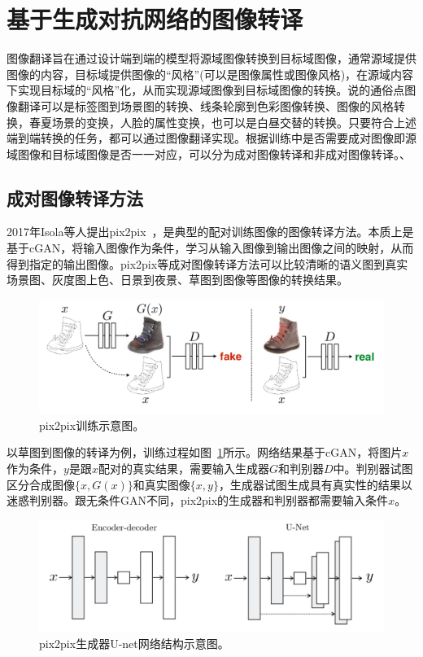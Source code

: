 \section{基于生成对抗网络的图像转译}
图像翻译旨在通过设计端到端的模型将源域图像转换到目标域图像，通常源域提供图像的内容，目标域提供图像的“风格”(可以是图像属性或图像风格)，在源域内容下实现目标域的“风格”化，从而实现源域图像到目标域图像的转换。说的通俗点图像翻译可以是标签图到场景图的转换、线条轮廓到色彩图像转换、图像的风格转换，春夏场景的变换，人脸的属性变换，也可以是白昼交替的转换。只要符合上述端到端转换的任务，都可以通过图像翻译实现。根据训练中是否需要成对图像即源域图像和目标域图像是否一一对应，可以分为成对图像转译和非成对图像转译。、


\subsection{成对图像转译方法}
2017年Isola等人提出pix2pix~\cite{isola2017image}，是典型的配对训练图像的图像转译方法。本质上是基于cGAN，将输入图像作为条件，学习从输入图像到输出图像之间的映射，从而得到指定的输出图像。pix2pix等成对图像转译方法可以比较清晰的语义图到真实场景图、灰度图上色、日景到夜景、草图到图像等图像的转换结果。

\begin{figure}[ht]
    \centering
	\includegraphics[width=\textwidth]{figs/pix2pix.pdf}
	\caption{pix2pix训练示意图。}
	\label{fig:pix2pix}
\end{figure}

以草图到图像的转译为例，训练过程如图~\ref{fig:pix2pix}所示。网络结果基于cGAN，将图片$x$作为条件，$y$是跟$x$配对的真实结果，需要输入生成器$G$和判别器$D$中。判别器试图区分合成图像$\{x,G(x)\}$和真实图像$\{x,y\}$，生成器试图生成具有真实性的结果以迷惑判别器。跟无条件GAN不同，pix2pix的生成器和判别器都需要输入条件$x$。

\begin{figure}[ht]
    \centering
	\includegraphics[width=\textwidth]{figs/unet.pdf}
	\caption{pix2pix生成器U-net网络结构示意图。}
	\label{fig:unet}
\end{figure}

